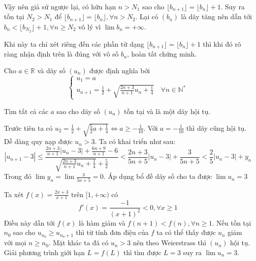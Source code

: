 \documentclass[11pt]{scrartcl}
\begin{document}
\begin{itemize}[label=, leftmargin=0em, itemsep=0.5em]
\begin{sol}
        Vậy nên giả sử ngược lại, có hữu hạn $n > N_1$ sao cho $\lfloor b_{n + 1} \rfloor =  \lfloor b_n \rfloor + 1$. Suy ra tồn tại $N_2 > N_1$ để $ \lfloor b_{n + 1} \rfloor =  \lfloor b_n \rfloor, \forall n > N_2$. Lại có $(b_n)$ là dãy tăng nên dẫn tới $b_n < \lfloor b_{N_2} \rfloor + 1, \forall n \geq N_2$ vô lý vì $\lim b_n = +\infty$.


        Khi này ta chỉ xét riêng đến các phần tử dạng $\lfloor b_{n + 1} \rfloor =  \lfloor b_n \rfloor + 1$ thì khi đó rõ ràng nhận định trên là đúng với vô số $b_n$, hoàn tất chứng minh.
        
        
    \end{sol}

    \begin{bt}
    	Cho $a\in\mathbb{R}$ và dãy số $(u_n)$ được định nghĩa bởi
\[ \begin{cases} u_1=a\\ u_{n+1}=\frac{1}{2}+\sqrt{\frac{2n+3}{n+1}u_n+\frac{1}{4}}\quad\forall n\in\mathbb{N}^* \end{cases} \]

 Tìm tất cả các $a$ sao cho dãy số $(u_n)$ tồn tại và là một dãy hội tụ.
    \end{bt}

    \begin{sol}
         Trước tiên ta có $u_2 = \frac{1}{2} + \sqrt{\frac{5}{2}a + \frac{1}{4}} \Leftrightarrow a \geq -\frac{1}{10}$. Với $a = -\frac{1}{10}$ thì dãy cũng hội tụ. Dễ dàng quy nạp được $u_n > 3$. Ta có khai triển như sau:
        \[
            |u_{n + 1} - 3| \leq \frac{\frac{2n + 3}{n + 1}|u_n- 3| + \frac{6n + 9}{n + 1} - 6}{\sqrt{\frac{2n + 3}{n + 1}u_n + \frac{1}{4}} + \frac{5}{2}} < \frac{2n + 3}{5n + 5}|u_n - 3| + \frac{3}{5n + 5} < \frac{2}{5}|u_n - 3| + y_n
        \]
        Trong đó $\lim y_n = \lim \frac{3}{5n + 5} = 0$. Áp dụng bổ đề dãy số cho ta được $\lim u_n = 3$


         Ta xét $f(x) = \frac{2x + 3}{x + 1}$ trên $[1,+\infty)$ có $$f'(x) = \frac{-1}{(x + 1)^2} < 0, \forall x \geq 1$$
        Điều này dẫn tới $f(x)$ là hàm giảm và $f(n + 1) < f(n), \forall n \geq 1$. Nếu tồn tại $n_0$ sao cho $u_{n_0} \geq u_{n_0 + 1}$ thì từ tính đơn điệu của $f$ ta có thể thấy được $u_n$ giảm với mọi $n \geq n_0$. Mặt khác ta đã có $u_n > 3$ nên theo Weierstrass thì $(u_n)$ hội tụ. Giải phương trình giới hạn $L = f(L)$ thì tìm được $L = 3$ suy ra $\lim u_n = 3$.



\end{sol}
\end{itemize}
\end{document}
